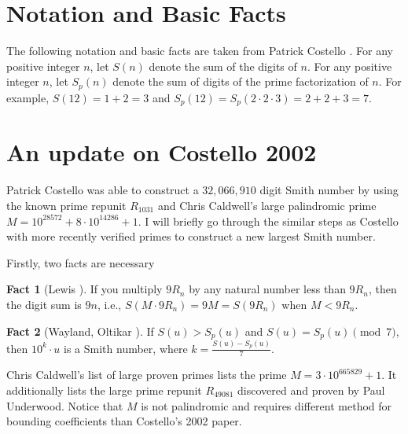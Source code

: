 \documentclass{amsart}
\newcommand{\RE}{{49081}}
\numberwithin{equation}{section}
\theoremstyle{plain} %
\theoremstyle{definition}
\newtheorem{fact}{Fact}
\theoremstyle{remark}
\begin{document}
 \section{Notation and Basic Facts}
The following notation and basic facts are taken from Patrick Costello \cite{Costello2002}. For any positive integer $n$, let $S(n)$ denote the sum of the digits of $n$. For any positive integer $n$, let $S_p(n)$ denote the sum of digits of the prime factorization of $n$. For example, $S(12) = 1 + 2 = 3$ and $S_p(12) = S_p(2\cdot 2 \cdot 3) = 2 + 2 + 3 = 7$.


 \section{An update on Costello 2002}
 Patrick Costello was able to construct a $32,066,910$ digit Smith number by using the known prime repunit $R_{1031}$ and Chris Caldwell's large palindromic prime $M = 10^{28572} + 8 \cdot 10^{14286} + 1$. I will briefly go through the similar steps as Costello with more recently verified primes to construct a new largest Smith number.

 Firstly, two facts are necessary

\begin{fact}[{Lewis \cite{?}}]
If you multiply $9R_n$ by any natural number less than $9R_n$, then the digit sum is $9n$, i.e.,
$S(M \cdot 9R_n) = 9M = S(9R_n)$  when $M < 9R_n$.
\end{fact}

\begin{fact}[{Wayland, Oltikar \cite{?}}]
If $S(u) > S_p(u)$ and $S(u) = S_p(u) \pmod{7}$, then $10^k \cdot u$ is a Smith number, where $k =\frac{S(u)-S_p(u)}{7}$.
\end{fact}

Chris Caldwell's list of large proven primes\cite{} lists the prime $M=  3 \cdot 10^{665829} + 1$. It additionally lists the large prime repunit $R_\RE$ discovered and proven by Paul Underwood\cite{?}. Notice that $M$ is not palindromic and requires different method for bounding coefficients than Costello's 2002 paper.
\end{document}
